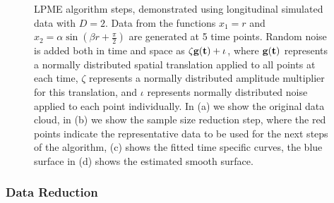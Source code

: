 \documentclass[12pt]{article}
\theoremstyle{definition}
\begin{document}
\begin{figure}[ht]
  \hfill
  \caption{LPME algorithm steps, demonstrated using longitudinal simulated data with $D=2$. Data from the functions $x_1 = r$ and $x_2 = \alpha \sin \left(\beta r + \frac{\pi}{2}\right)$ are generated at 5 time points. Random noise is added both in time and space as $\zeta \bf{g}(t) + \iota$, where $\bf{g}(t)$ represents a normally distributed spatial translation applied to all points at each time, $\zeta$ represents a normally distributed amplitude multiplier for this translation, and $\iota$ represents normally distributed noise applied to each point individually. In (a) we show the original data cloud, in (b) we show the sample size reduction step, where the red points indicate the representative data to be used for the next steps of the algorithm, (c) shows the fitted time specific curves, the blue surface in (d) shows the estimated smooth surface. }
  \label{fig:lpme_steps}
\end{figure}


\subsubsection{Data Reduction}
\end{document}
